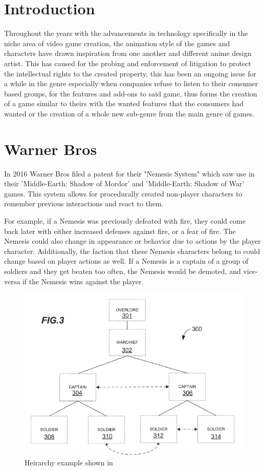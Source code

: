 \documentclass[12pt,letterpaper]{article}
\begin{document}
\pagebreak

\section{Introduction}
Throughout the years with the advancements in technology specifically in the niche area of video game creation, the animation style of the games and characters have drawn inspiration from one another and different anime design artist.
This has caused for the probing and enforcement of litigation to protect the intellectual rights to the created property, this has been an ongoing issue for a while in the genre especially when companies refuse to listen to their consumer based groups,
for the features and add-ons to said game, thus forms the creation of a game similar to theirs with the wanted features that the consumers had wanted or the creation of a whole new sub-genre from the main genre of games.


\section {Warner Bros}
In 2016 Warner Bros filed a patent for their "Nemesis System" which saw use in their 'Middle-Earth: Shadow of Mordor' and 'Middle-Earth: Shadow of War' games. This system allows for procedurally created non-player characters to remember previous interactions and react to them.

For example, if a Nemesis was previously defeated with fire, they could come back later with either increased defenses against fire, or a fear of fire. The Nemesis could also change in appearance or behavior due to actions by the player character. Additionally, the faction that these Nemesis characters belong to could change based on player actions as well. If a Nemesis is a captain of a group of soldiers and they get beaten too often, the Nemesis would be demoted, and vice-versa if the Nemesis wins against the player.
\begin{figure}
    \centering
    \includegraphics[width=0.5\linewidth]{nemesis.PNG}
    \caption{Heirarchy example shown in \cite{wb}}
    \label{fig:seanpic}
\end{figure}
\end{document}
